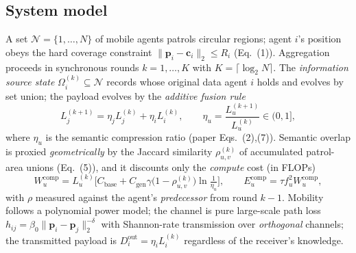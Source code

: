 \documentclass[11pt,a4paper]{article}
\begin{document}
\subsection{System model}
A set $\mathcal{N}=\{1,\dots,N\}$ of mobile agents patrols circular regions; agent $i$'s position obeys the hard coverage constraint $\lVert \mathbf p_i-\mathbf c_i\rVert_2\le R_i$ (Eq.~(1)). Aggregation proceeds in synchronous rounds $k=1,\dots,K$ with $K=\lceil\log_2 N\rceil$. The \emph{information source state} $\Omega_i^{(k)}\subseteq\mathcal N$ records whose original data agent $i$ holds and evolves by set union; the payload evolves by the \emph{additive fusion rule}
\begin{equation}
L_j^{(k+1)}=\eta_j L_j^{(k)}+\eta_i L_i^{(k)},\qquad \eta_u=\frac{L_u^{(k+1)}}{L_u^{(k)}}\in(0,1],
\label{eq:fusion}
\end{equation}
where $\eta_u$ is the semantic compression ratio (paper Eqs.~(2),(7)). Semantic overlap is proxied \emph{geometrically} by the Jaccard similarity $\rho^{(k)}_{u,v}$ of accumulated patrol-area unions (Eq.~(5)), and it discounts only the \emph{compute} cost (in FLOPs)
\begin{equation}
W^{\mathrm{comp}}_u=L_u^{(k)}\Big[C_{\mathrm{base}}+C_{\mathrm{gen}}\gamma\big(1-\rho^{(k)}_{u,v}\big)\ln\tfrac{1}{\eta_u}\Big],
\qquad E_u^{\mathrm{comp}}=\tau f_u^2 W_u^{\mathrm{comp}},
\label{eq:comp}
\end{equation}
with $\rho$ measured against the agent's \emph{predecessor} from round $k{-}1$. Mobility follows a polynomial power model; the channel is pure large-scale path loss $h_{ij}=\beta_0\lVert\mathbf p_i-\mathbf p_j\rVert_2^{-\delta}$ with Shannon-rate transmission over \emph{orthogonal} channels; the transmitted payload is $D_i^{\mathrm{out}}=\eta_i L_i^{(k)}$ regardless of the receiver's knowledge.
\end{document}
